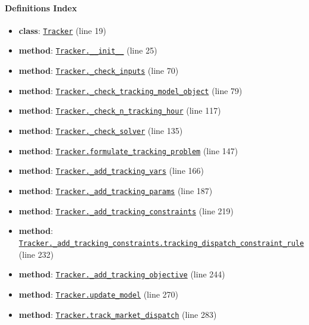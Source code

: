 \documentclass[11pt]{report}
\begin{document}
\paragraph{Definitions Index}
\begin{itemize}[leftmargin=*]
  \item \textbf{class}: \hyperref[def:tracker.py:Tracker:L19]{\texttt{Tracker}} (line 19)
  \item \textbf{method}: \hyperref[def:tracker.py:Tracker.__init__:L25]{\texttt{Tracker.\_\_init\_\_}} (line 25)
  \item \textbf{method}: \hyperref[def:tracker.py:Tracker._check_inputs:L70]{\texttt{Tracker.\_check\_inputs}} (line 70)
  \item \textbf{method}: \hyperref[def:tracker.py:Tracker._check_tracking_model_object:L79]{\texttt{Tracker.\_check\_tracking\_model\_object}} (line 79)
  \item \textbf{method}: \hyperref[def:tracker.py:Tracker._check_n_tracking_hour:L117]{\texttt{Tracker.\_check\_n\_tracking\_hour}} (line 117)
  \item \textbf{method}: \hyperref[def:tracker.py:Tracker._check_solver:L135]{\texttt{Tracker.\_check\_solver}} (line 135)
  \item \textbf{method}: \hyperref[def:tracker.py:Tracker.formulate_tracking_problem:L147]{\texttt{Tracker.formulate\_tracking\_problem}} (line 147)
  \item \textbf{method}: \hyperref[def:tracker.py:Tracker._add_tracking_vars:L166]{\texttt{Tracker.\_add\_tracking\_vars}} (line 166)
  \item \textbf{method}: \hyperref[def:tracker.py:Tracker._add_tracking_params:L187]{\texttt{Tracker.\_add\_tracking\_params}} (line 187)
  \item \textbf{method}: \hyperref[def:tracker.py:Tracker._add_tracking_constraints:L219]{\texttt{Tracker.\_add\_tracking\_constraints}} (line 219)
  \item \textbf{method}: \hyperref[def:tracker.py:Tracker._add_tracking_constraints.tracking_dispatch_constraint_rule:L232]{\texttt{Tracker.\_add\_tracking\_constraints.tracking\_dispatch\_constraint\_rule}} (line 232)
  \item \textbf{method}: \hyperref[def:tracker.py:Tracker._add_tracking_objective:L244]{\texttt{Tracker.\_add\_tracking\_objective}} (line 244)
  \item \textbf{method}: \hyperref[def:tracker.py:Tracker.update_model:L270]{\texttt{Tracker.update\_model}} (line 270)
  \item \textbf{method}: \hyperref[def:tracker.py:Tracker.track_market_dispatch:L283]{\texttt{Tracker.track\_market\_dispatch}} (line 283)

\end{itemize}
\end{document}
